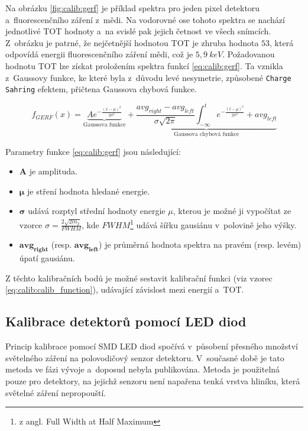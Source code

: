 Na obrázku \ref{fig:calib:gerf} je příklad spektra pro jeden pixel detektoru a~fluorescenčního záření z~mědi. Na vodorovné ose tohoto spektra se nachází jednotlivé TOT hodnoty a~na svislé pak jejich četnost ve všech snímcích. Z~obrázku je patrné, že nejčetnější hodnotou TOT je zhruba hodnota $53$, která odpovídá energii fluorescenčního záření mědi, což je $5,9~keV$. Požadovanou hodnotu TOT lze získat proložením spektra funkcí \ref{eq:calib:gerf}. Ta vznikla z~Gaussovy funkce, ke které byla z~důvodu levé nesymetrie, způsobené \texttt{Charge Sahring} efektem, přičtena Gaussova chybová funkce. 

\begin{equation}\label{eq:calib:gerf}
	f_{GERF}(x) = \underbrace{Ae^{ -\frac{(x-\mu)^2}{2\sigma^2} }}_{\text{Gaussova funkce}} +
	\underbrace{ \frac{avg_{right} - avg_{left}}{\sigma\sqrt{2\pi}} \int_{-\infty}^t e^{ -\frac{(t-\mu)^2}{2\sigma^2} } + avg_{left}}_{\text{Gaussova chybová funkce}}
\end{equation}

Parametry funkce \ref{eq:calib:gerf} jsou následující:
\begin{itemize}
	\item $\mathbf{A}$ je amplituda.
	\item $\mathbf{\mu}$ je stření hodnota hledané energie.
	\item $\mathbf{\sigma}$ udává rozptyl střední hodnoty energie $\mu$, kterou je možné ji vypočítat ze vzorce 
		$\sigma = \frac{2\sqrt{2ln_2}}{FWHM}$, kde $FWHM$\footnote{z angl. Full Width at Half Maximum} udává šířku gausiánu v~polovině jeho výšky.
	\item $\mathbf{avg_{right}}$ (resp. $\mathbf{avg_{left}}$) je průměrná hodnota spektra na pravém (resp. levém) úpatí gausiánu.
\end{itemize}

Z těchto kalibračních bodů je možné sestavit kalibrační funkci (viz vzorec \ref{eq:calib:calib_function}), udávající závislost mezi energií a~TOT.


\subsection{Kalibrace detektorů pomocí LED diod}\label{calib:led}
Princip kalibrace pomocí SMD LED diod spočívá v~působení přesného množství světelného záření na polovodičový senzor detektoru. V~současné době je tato metoda ve fázi vývoje a~doposud nebyla publikována. Metoda je použitelná pouze pro detektory, na jejichž senzoru není napařena tenká vrstva hliníku, která světelné záření nepropouští. 

